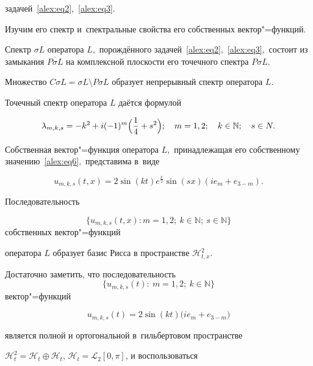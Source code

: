 задачей~\eqref{alex:eq2},~\eqref{alex:eq3}. 

Изучим его спектр и~спектральные свойства его собственных вектор"=функций.



\smallskip



\begin{theorem}[2]Спектр $\sigma{L}$ оператора $L,$ порождённого задачей~\eqref{alex:eq2}$,$ \eqref{alex:eq3}$,$ состоит из замыкания $\overline{P\sigma{L}}$ на комплексной плоскости его точечного спектра $P\sigma{L}.$ 

Множество $C\sigma{L}=\sigma{L}\setminus{P\sigma{L}}$ образует непрерывный спектр оператора $L.$ 

Точечный спектр оператора ${L}$ даётся формулой

\begin{equation}\label{alex:eq6}

\lambda_{m,k,s}=-k^2 +i(-1)^{m}\Bigl(\frac{1}{4}+s^2 \Bigr);\quad m=1, 2; \quad  k\in\mathbb{N}; \quad s\in{N}.

\end{equation}

Собственная вектор"=функция оператора ${L},$ принадлежащая его собственному значению~\eqref{alex:eq6}$,$ представима в~виде

$$

u_{m,k,s}(t,x)=2\sin(kt)e^{\frac{x}{2}}\sin(sx)\left(ie_m+e_{3-m}\right).

$$

Последовательность 

$$\{u_{m,k,s}(t,x): m=1, 2;~ k\in\mathbb{N};~s\in\mathbb{N}\}$$ собственных вектор"=функций

оператора $L$ образует базис Рисса в пространстве $\mathcal{H}^2_{t,x}.$

\end{theorem}



\smallskip



Достаточно заметить, что последовательность $$ \{u_{m,k,s}(t):\ m=1, 2;\ k\in\mathbb{N}\}$$ вектор"=функций

$$

u_{m,k,s}(t)=2\sin(kt)\bigl(ie_m + e_{3-m}\bigr)

$$

является полной и ортогональной в~гильбертовом пространстве 

$\mathcal{H}^2_{t}=\mathcal{H}_{t}\oplus\mathcal{H}_{t}$, $\mathcal{H}_{t}=\mathcal{L}_2[0, \pi]$, и воспользоваться

